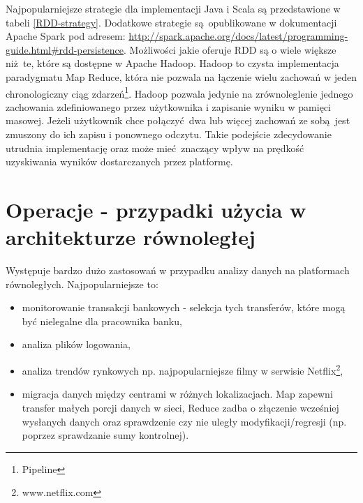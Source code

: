 Najpopularniejsze strategie dla implementacji Java i Scala są przedstawione w tabeli \ref{RDD-strategy}. Dodatkowe strategie są opublikowane w dokumentacji Apache Spark pod adresem: \url{http://spark.apache.org/docs/latest/programming-guide.html#rdd-persistence}. Możliwości jakie oferuje RDD są o wiele większe niż te, które są dostępne w Apache Hadoop. Hadoop to czysta implementacja paradygmatu Map Reduce, która nie pozwala na łączenie wielu zachowań w jeden chronologiczny ciąg zdarzeń\footnote{Pipeline}. Hadoop pozwala jedynie na zrównoleglenie jednego zachowania zdefiniowanego przez użytkownika i zapisanie wyniku w pamięci masowej. Jeżeli użytkownik chce połączyć dwa lub więcej zachowań ze sobą jest zmuszony do ich zapisu i ponownego odczytu. Takie podejście zdecydowanie utrudnia implementację oraz może mieć znaczący wpływ na prędkość uzyskiwania wyników dostarczanych przez platformę. 

\section{Operacje - przypadki użycia w architekturze równoległej}
Występuje bardzo dużo zastosowań w przypadku analizy danych na platformach równoległych. Najpopularniejsze to:
\begin{itemize}
	\item monitorowanie transakcji bankowych - selekcja tych transferów, które mogą być nielegalne dla pracownika banku,
	\item analiza plików logowania,
	\item analiza trendów rynkowych np. najpopularniejsze filmy w serwisie Netflix\footnote{www.netflix.com},
	\item migracja danych między centrami w różnych lokalizacjach. Map zapewni transfer małych porcji danych w sieci, Reduce zadba o złączenie wcześniej wysłanych danych oraz sprawdzenie czy nie uległy modyfikacji/regresji (np. poprzez sprawdzanie sumy kontrolnej). 
\end{itemize}